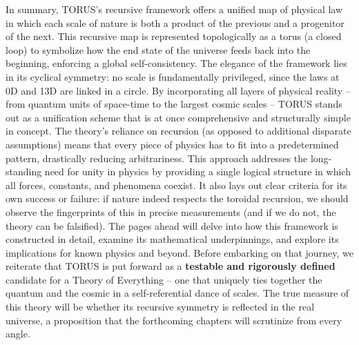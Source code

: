 \documentclass[
]{article}
\begin{document}
In summary, TORUS's recursive framework offers a unified map of physical
law in which each scale of nature is both a product of the previous and
a progenitor of the next. This recursive map is represented
topologically as a torus (a closed loop) to symbolize how the end state
of the universe feeds back into the beginning, enforcing a global
self-consistency. The elegance of the framework lies in its cyclical
symmetry: no scale is fundamentally privileged, since the laws at 0D and
13D are linked in a circle. By incorporating all layers of physical
reality -- from quantum units of space-time to the largest cosmic scales
-- TORUS stands out as a unification scheme that is at once
comprehensive and structurally simple in concept. The theory's reliance
on recursion (as opposed to additional disparate assumptions) means that
every piece of physics has to fit into a predetermined pattern,
drastically reducing arbitrariness. This approach addresses the
long-standing need for unity in physics by providing a single logical
structure in which all forces, constants, and phenomena coexist. It also
lays out clear criteria for its own success or failure: if nature indeed
respects the toroidal recursion, we should observe the fingerprints of
this in precise measurements (and if we do not, the theory can be
falsified). The pages ahead will delve into how this framework is
constructed in detail, examine its mathematical underpinnings, and
explore its implications for known physics and beyond. Before embarking
on that journey, we reiterate that TORUS is put forward as a
\textbf{testable and rigorously defined} candidate for a Theory of
Everything -- one that uniquely ties together the quantum and the cosmic
in a self-referential dance of scales. The true measure of this theory
will be whether its recursive symmetry is reflected in the real
universe, a proposition that the forthcoming chapters will scrutinize
from every angle.
\end{document}
